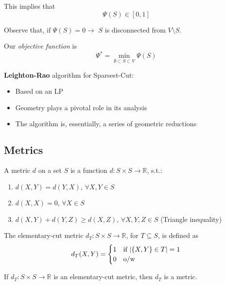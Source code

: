     This implies that
    \[ \Psi(S) \in [0,1] \]

    Observe that, if $\Psi(S) = 0 \rightarrow$ $S$ is disconnected from $V \setminus S$.

    Our \textit{objective function} is
    \[ \Psi^* = \min_{\emptyset \subset S \subset V} \Psi(S) \]

    \textbf{Leighton-Rao} algorithm for Sparsest-Cut:
    \begin{itemize}
        \item Based on an LP
        \item Geometry plays a pivotal role in its analysis
        \item The algorithm is, essentially, a series of geometric reductions
    \end{itemize}


\subsection{Metrics}

    \begin{definition}[Metric]
        A metric $d$ on a set $S$ is a function $d : S \times S \rightarrow \mathbb{R}$, s.t.:
        \begin{enumerate}
            \item $d(X,Y) = d(Y,X)$, $\forall X,Y \in S$
            \item $d(X,X) = 0$, $\forall X \in S$
            \item $d(X,Y) + d(Y,Z) \geq d(X,Z)$, $\forall X,Y,Z \in S$ (Triangle inequality)
        \end{enumerate}
    \end{definition}

    \begin{definition}
        The elementary-cut metric $d_T : S \times S \rightarrow \mathbb{R}$, for $T \subseteq S$, is defined as
        \begin{equation}
            d_T(X,Y) = 
            \begin{cases}
                1 & \text{if } \vert \{X,Y\} \in T  \vert = 1\\
                0 & \text{o/w}
            \end{cases}
        \end{equation}
    \end{definition}

    \begin{lemma}
        If $d_T : S \times S \rightarrow \mathbb{R}$ is an elementary-cut metric, then $d_T$ is a metric.
    \end{lemma}

